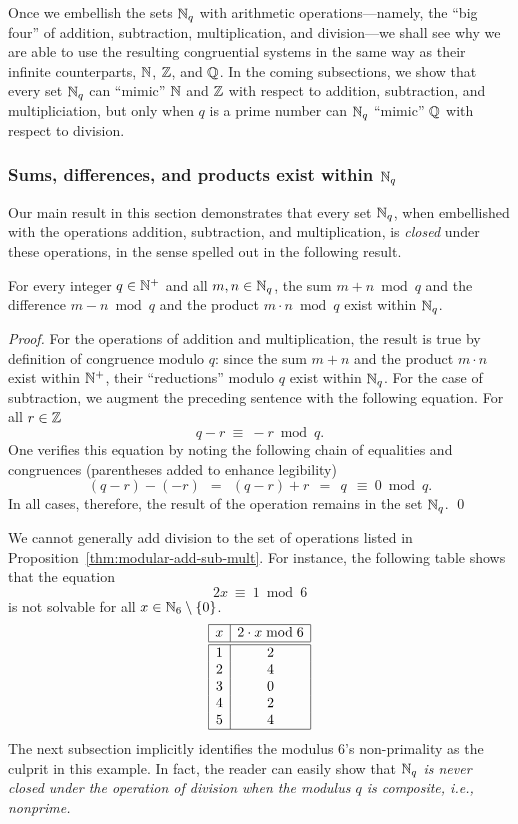 Once we embellish the sets $\mathbb{N}_q$ with arithmetic operations---namely,
the ``big four'' of addition, subtraction, multiplication, and
division---we shall see why we are able to use the resulting
congruential systems in the same way as their infinite counterparts,
$\mathbb{N}$, $\mathbb{Z}$, and $\mathbb{Q}$.  In the coming subsections, we show that every
set $\mathbb{N}_q$ can ``mimic'' $\mathbb{N}$ and $\mathbb{Z}$ with respect to addition,
subtraction, and multipliciation, but only when $q$ is a prime number
can $\mathbb{N}_q$ ``mimic'' $\mathbb{Q}$ with respect to division.

\subsubsection{Sums, differences, and products exist within $\mathbb{N}_q$}
\label{sec:modular-add-sub-mult}

Our main result in this section demonstrates that every set $\mathbb{N}_q$,
when embellished with the operations addition, subtraction, and
multiplication, is {\em closed} under these operations, in the sense
spelled out in the following result.

\begin{prop}
\label{thm:modular-add-sub-mult}
For every integer $q \in \mathbb{N}^+$ and all $m,n \in \mathbb{N}_q$, the sum $m+n
\bmod q$ and the difference $m-n \bmod q$ and the product $m \cdot n \bmod
q$ exist within $\mathbb{N}_q$.
\end{prop}

\begin{proof}
For the operations of addition and multiplication, the result is true
by definition of congruence modulo $q$: since the sum $m+n$ and the
product $m \cdot n$ exist within $\mathbb{N}^+$, their ``reductions'' modulo
$q$ exist within $\mathbb{N}_q$.  For the case of subtraction, we augment the
preceding sentence with the following equation.  For all $r \in \mathbb{Z}$
\[ q-r \ \equiv \ -r \bmod q. \]
One verifies this equation by noting the following chain of equalities
and congruences (parentheses added to enhance legibility)
\[ (q-r) - (-r) \ \ = \ \ (q-r) + r \ \ = \ \ q \ \ \equiv \ 0 \bmod q. \] 
In all cases, therefore, the result of the operation remains in the set
$\mathbb{N}_q$.
\qed
\end{proof}

We cannot generally add division to the set of operations listed in
Proposition~\ref{thm:modular-add-sub-mult}.  For instance, the
following table shows that the equation 
\[ 2x \ \equiv \ 1 \bmod 6 \]
is not solvable for all $x \in \mathbb{N}_6 \setminus \{0\}$.
\[ \begin{array}{|c|c|}
\hline
x & 2 \cdot x \bmod 6 \\
\hline
\hline
1 & 2 \\
2 & 4 \\
3 & 0 \\
4 & 2 \\
5 & 4 \\
\hline
\end{array}
\]
The next subsection implicitly identifies the modulus $6$'s
non-primality as the culprit in this example.  In fact, the reader can
easily show that {\em $\mathbb{N}_q$ is never closed under the operation of
  division when the modulus $q$ is composite, i.e., nonprime.}


